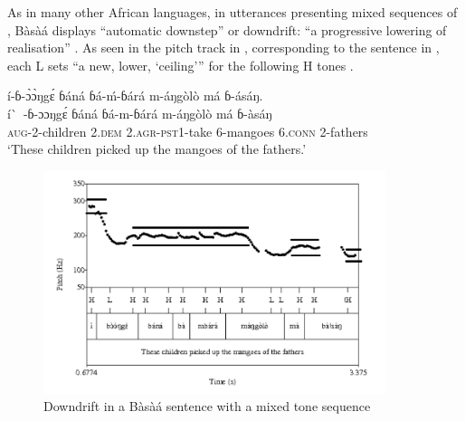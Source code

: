 \documentclass[output=paper,newtxmath,modfonts,nonflat,hidelinks]{langsci/langscibook}
\begin{document}
\begin{table}
\caption{Tonal minimal pairs in Bàsà{á} \citep{MakassoLee15}}
\label{tab:HamlaouiMakasso:1}
\end{table}

As in many other African  languages, in utterances presenting mixed sequences of , Bàsà{á} displays ``automatic downstep'' or downdrift: 
``a progressive lowering of  realisation'' \citep[2]{DowningRialland16}. As seen in the pitch track in , corresponding to the sentence in , each L  sets ``a new, lower, `ceiling'{}'' for the following H tones \citep{Connell11}.

\ea í-ɓ-\`ɔ\`ɔŋg\'ɛ ɓ{á}n{á} ɓ{á}-\'m-ɓ{á}r{á} m-{á}ŋgòlò m{á} ɓ-{á}{\textdownstep}s{á}ŋ.\\
\gll í\`~-ɓ-ɔɔŋg\'ɛ ɓ{á}n{á} ɓ{á}-m-ɓ{á}r{á} m-{á}ŋgòlò m{á} ɓ-às{á}ŋ\\
\textsc{aug}-2-children 2.\textsc{dem} 2.\textsc{agr}-\textsc{pst1}-take 6-mangoes 6.\textsc{conn} 2-fathers\\
\glt `These children picked up the mangoes of the fathers.' \label{ex:HamlaouiMakasso:1} \\ \citep{MakassoEtAl17}
\z
{}

\begin{figure} 
\includegraphics[width=10cm]{figures/Downdrift}
\caption{Downdrift in a Bàsà{á} sentence with a mixed tone sequence \citep{MakassoEtAl17} \label{fig:HamlaouiMakasso:2}} 
\end{figure}
\end{document}
